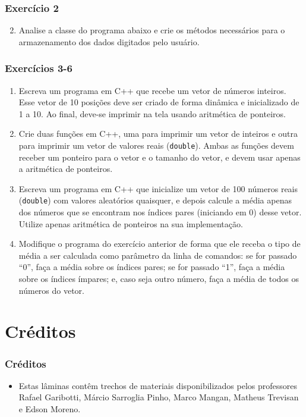 \documentclass[aspectratio=169]{beamer}
\begin{document}
\begin{frame}[fragile]\frametitle{Exercício 2}
\begin{enumerate}
	\setcounter{enumi}{1}
	\item Analise a classe do programa abaixo e crie os métodos necessários para o armazenamento dos dados digitados pelo usuário.

\end{enumerate}
\end{frame}

\begin{frame}\frametitle{Exercícios 3-6}
\begin{enumerate}
	\small
	\setcounter{enumi}{2}
	\item Escreva um programa em C++ que recebe um vetor de números inteiros. Esse vetor de 10 posições deve
ser criado de forma dinâmica e inicializado de 1 a 10. Ao final, deve-se imprimir na tela usando
aritmética de ponteiros.
	\item Crie duas funções em C++, uma para imprimir um vetor de inteiros e outra para imprimir um vetor de valores reais (\texttt{double}). Ambas as funções devem receber um ponteiro para o vetor e o tamanho do vetor, e devem usar apenas a aritmética de ponteiros.
	\item Escreva um programa em C++ que inicialize um vetor de 100 números reais (\texttt{double}) com valores aleatórios quaisquer, e depois calcule a média apenas dos números que se encontram nos índices pares (iniciando em 0) desse vetor. Utilize apenas aritmética de ponteiros na sua implementação.
	\item Modifique o programa do exercício anterior de forma que ele receba o tipo de média a ser calculada como parâmetro da linha de comandos: se for passado ``0'', faça a média sobre os índices pares; se for passado ``1'', faça a média sobre os índices ímpares; e, caso seja outro número, faça a média de todos os números do vetor.	
\end{enumerate}
\end{frame}

\section{Créditos}

\begin{frame}\frametitle{Créditos}
\begin{itemize}
	\item Estas lâminas contêm trechos de materiais disponibilizados pelos professores Rafael Garibotti, Márcio Sarroglia Pinho, Marco Mangan, Matheus Trevisan e Edson Moreno.
\end{itemize}
\end{frame}
\end{document}
